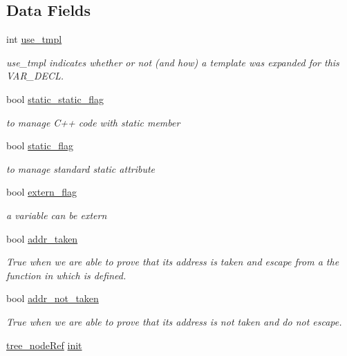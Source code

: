 \subsection*{Data Fields}
\begin{DoxyCompactItemize}
\item 
int \hyperlink{structvar__decl_a3b4eaf4a3739c99e3fb40989053b7205}{use\+\_\+tmpl}
\begin{DoxyCompactList}\small\item\em use\+\_\+tmpl indicates whether or not (and how) a template was expanded for this V\+A\+R\+\_\+\+D\+E\+CL. \end{DoxyCompactList}\item 
bool \hyperlink{structvar__decl_aff775359d2600674ebb3db1bd469aa9a}{static\+\_\+static\+\_\+flag}
\begin{DoxyCompactList}\small\item\em to manage C++ code with static member \end{DoxyCompactList}\item 
bool \hyperlink{structvar__decl_a58ea3e21cd906a53ea4fcc07b642288d}{static\+\_\+flag}
\begin{DoxyCompactList}\small\item\em to manage standard static attribute \end{DoxyCompactList}\item 
bool \hyperlink{structvar__decl_a34146dccb0fce580edb7f412e5984d43}{extern\+\_\+flag}
\begin{DoxyCompactList}\small\item\em a variable can be extern \end{DoxyCompactList}\item 
bool \hyperlink{structvar__decl_a8573104e8a30d9d2ba0e3b0414ee668d}{addr\+\_\+taken}
\begin{DoxyCompactList}\small\item\em True when we are able to prove that its address is taken and escape from a the function in which is defined. \end{DoxyCompactList}\item 
bool \hyperlink{structvar__decl_addd62259715bc6aba964518eced2917d}{addr\+\_\+not\+\_\+taken}
\begin{DoxyCompactList}\small\item\em True when we are able to prove that its address is not taken and do not escape. \end{DoxyCompactList}\item 
\hyperlink{tree__node_8hpp_a6ee377554d1c4871ad66a337eaa67fd5}{tree\+\_\+node\+Ref} \hyperlink{structvar__decl_a2567c8702cd5241fc2ba9fffeb5bb8ca}{init}

\end{DoxyCompactItemize}
